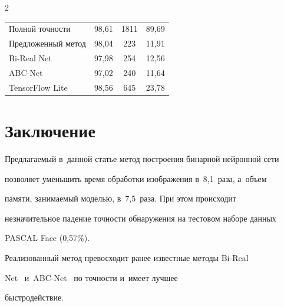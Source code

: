 \begin{multicols}{2}
\begin{center}
{\begin{tabular}{|l|c|c|c|}
\hline


Полной точности&98,61&1811\hphantom{9}&89,69\\


Предложенный метод&98,04&223&11,91\\


Bi-Real Net&97,98&254&12,56\\


ABC-Net&97,02&240&11,64\\


TensorFlow Lite&98,56&645&23,78\\


\hline


\end{tabular}


}


\end{center}




  


  


\vspace*{-6pt}





\section{Заключение}


  


  Предлагаемый в~данной \mbox{статье} метод по\-стро\-ения бинарной нейронной сети 


поз\-во\-ля\-ет уменьшить время обработки изоб\-ра\-же\-ния в~8,1~раза, а~объем 


памяти, за\-ни\-ма\-емый моделью, в~7,5~раза. При этом происходит 


незначительное падение точ\-ности обнаружения на тес\-то\-вом наборе данных 


\mbox{PASCAL} Face (0,57\%).


  


  Реализованный метод превосходит ранее известные методы Bi-Real 


Net~\cite{7-mal} и~ABC-Net~\cite{8-mal} по точ\-ности и~имеет лучшее  


быст\-ро\-дей\-ст\-вие. 


  



\end{multicols}
